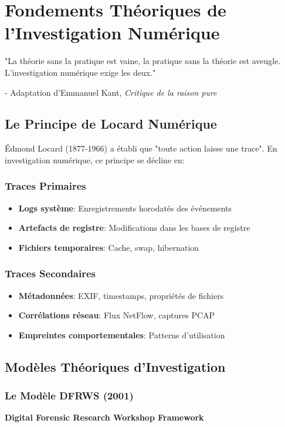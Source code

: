 \chapter{Fondements Théoriques de l'Investigation Numérique}
\epigraph{"La théorie sans la pratique est vaine, la pratique sans la théorie est aveugle. L'investigation numérique exige les deux."}{- Adaptation d'Emmanuel Kant, \textit{Critique de la raison pure}}
\section{Le Principe de Locard Numérique}
Édmond Locard (1877-1966) a établi que "toute action laisse une trace". En investigation numérique, ce principe se décline en:

\subsection{Traces Primaires}
\begin{itemize}
\item \textbf{Logs système}: Enregistrements horodatés des événements
\item \textbf{Artefacts de registre}: Modifications dans les bases de registre
\item \textbf{Fichiers temporaires}: Cache, swap, hibernation
\end{itemize}

\subsection{Traces Secondaires}
\begin{itemize}
\item \textbf{Métadonnées}: EXIF, timestamps, propriétés de fichiers
\item \textbf{Corrélations réseau}: Flux NetFlow, captures PCAP
\item \textbf{Empreintes comportementales}: Patterns d'utilisation
\end{itemize}

\section{Modèles Théoriques d'Investigation}
\subsection{Le Modèle DFRWS (2001)}
\textbf{Digital Forensic Research Workshop Framework}

